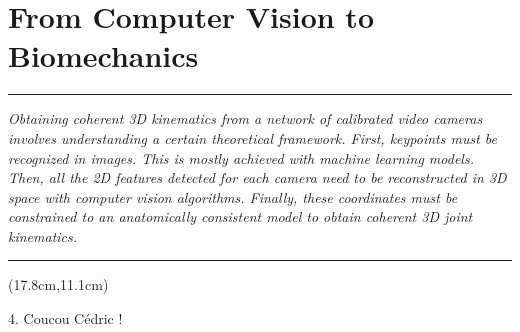 
\lhead[\fancyplain{}{\leftmark}]%
      {\fancyplain{}{}} %
\chead[\fancyplain{}{}]%
      {\fancyplain{}{}}
\rhead[\fancyplain{}{}]%
      {\fancyplain{}{\rightmark}}%
\lfoot[\fancyplain{}{}]%
      {\fancyplain{}{}}
\cfoot[\fancyplain{}{\thepage}]%
      {\fancyplain{}{\thepage}} %
\rfoot[\fancyplain{}{}]%
     {\fancyplain{}{\scriptsize}}



\chapter{From Computer Vision to Biomechanics}
\label{ch:2}


\begin{center}
\rule{0.7\linewidth}{.5pt}
\begin{minipage}{0.7\linewidth}
\smallskip

\textit{Obtaining coherent 3D kinematics from a network of calibrated video cameras involves understanding a certain theoretical framework. First, keypoints must be recognized in images. This is mostly achieved with machine learning models. Then, all the 2D features detected for each camera need to be reconstructed in 3D space with computer vision algorithms. Finally, these coordinates must be constrained to an anatomically consistent model to obtain coherent 3D joint kinematics.}

\end{minipage}
\smallskip
\rule{0.7\linewidth}{.5pt}
\end{center}

\begin{textblock*}{10cm}(17.8cm,11.1cm) %
	\begin{turn}{0}  
		  \scriptsize \emojiegg
		  \tiny 4. Coucou Cédric !
		  \scriptsize \emojihatching
	\end{turn}
\end{textblock*}

